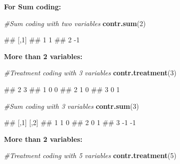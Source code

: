 \documentclass[
]{book}
\newenvironment{Shaded}{\begin{snugshade}}{\end{snugshade}}
\newcommand{\CommentTok}[1]{\textcolor[rgb]{0.56,0.35,0.01}{\textit{#1}}}
\newcommand{\DecValTok}[1]{\textcolor[rgb]{0.00,0.00,0.81}{#1}}
\newcommand{\FunctionTok}[1]{\textcolor[rgb]{0.13,0.29,0.53}{\textbf{#1}}}
\newcommand{\NormalTok}[1]{#1}
\begin{document}
\textbf{For Sum coding:}

\begin{Shaded}
\begin{Highlighting}[]
\CommentTok{\#Sum coding with two variables}
\FunctionTok{contr.sum}\NormalTok{(}\DecValTok{2}\NormalTok{)}
\end{Highlighting}
\end{Shaded}

\begin{Shaded}
\begin{Highlighting}[]
\NormalTok{\#\#   [,1]}
\NormalTok{\#\# 1    1}
\NormalTok{\#\# 2   {-}1}
\end{Highlighting}
\end{Shaded}

\textbf{More than 2 variables:}

\begin{Shaded}
\begin{Highlighting}[]
\CommentTok{\#Treatment coding with 3 variables}
\FunctionTok{contr.treatment}\NormalTok{(}\DecValTok{3}\NormalTok{)}
\end{Highlighting}
\end{Shaded}

\begin{Shaded}
\begin{Highlighting}[]
\NormalTok{\#\#   2 3}
\NormalTok{\#\# 1 0 0}
\NormalTok{\#\# 2 1 0}
\NormalTok{\#\# 3 0 1}
\end{Highlighting}
\end{Shaded}

\begin{Shaded}
\begin{Highlighting}[]
\CommentTok{\#Sum coding with 3 variables}
\FunctionTok{contr.sum}\NormalTok{(}\DecValTok{3}\NormalTok{)}
\end{Highlighting}
\end{Shaded}

\begin{Shaded}
\begin{Highlighting}[]
\NormalTok{\#\#   [,1] [,2]}
\NormalTok{\#\# 1    1    0}
\NormalTok{\#\# 2    0    1}
\NormalTok{\#\# 3   {-}1   {-}1}
\end{Highlighting}
\end{Shaded}

\textbf{More than 2 variables:}

\begin{Shaded}
\begin{Highlighting}[]
\CommentTok{\#Treatment coding with 5 variables}
\FunctionTok{contr.treatment}\NormalTok{(}\DecValTok{5}\NormalTok{)}
\end{Highlighting}
\end{Shaded}
\end{document}
